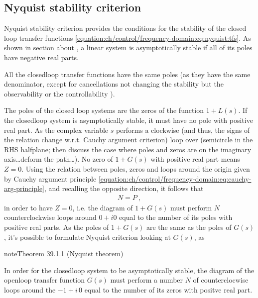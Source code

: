 \documentclass[letterpaper,10pt,english]{jupyterBook}
\begin{document}
\subsection{Nyquist stability criterion}
\label{\detokenize{ch/control/frequency-domain:nyquist-stability-criterion}}\label{\detokenize{ch/control/frequency-domain:control-frequency-siso-nyquist}}
\sphinxAtStartPar
Nyquist stability criterion provides the conditions for the stability of the closed loop transfer functions \eqref{equation:ch/control/frequency-domain:eq:nyquist:tfs}. As shown in section about {\hyperref[\detokenize{ch/system-theory/lti-stability-and-feedback:ode-lti-stability-fb}]{}}, a linear system is asymptotically stable if all of its poles have negative real parts.

\sphinxAtStartPar
All the closed\sphinxhyphen{}loop transfer functions have the same poles (as they have the same denominator, except for  cancellations not changing the stability but the observability or the controllability  ).

\sphinxAtStartPar
The poles of the closed loop systems are the zeros of the function \(1 + L(s)\). If the closed\sphinxhyphen{}loop system is asymptotically stable, it must have no pole with positive real part. As the complex variable \(s\) performs a clockwise (and thus, the signs of the relation change w.r.t. Cauchy argument criterion) loop over  (semicircle in the RHS half\sphinxhyphen{}plane; then  discuss the case where poles and zeros are on the imaginary axis…deform the path…). No zero of \(1 + G(s)\) with positive real part means \(Z = 0\). Using the relation between poles, zeros and loops around the origin given by Cauchy argument principle \eqref{equation:ch/control/frequency-domain:eq:cauchy-arg-principle}, and recalling the opposite direction, it follows that
\begin{equation*}
\begin{split}N = P \ ,\end{split}
\end{equation*}
\sphinxAtStartPar
in order to have \(Z = 0\), i.e. the diagram of \(1+G(s)\) must perform \(N\) counter\sphinxhyphen{}clockwise loops around \(0+i0\) equal to the number of its poles with positive real parts. As the poles of \(1+ G(s)\) are the same as the poles of \(G(s)\), it’s possible to formulate Nyquist criterion looking at \(G(s)\), as
\label{ch/control/frequency-domain:thm-nyquist}
\begin{sphinxadmonition}{note}{Theorem 39.1.1 (Nyquist theorem)}



\sphinxAtStartPar
In order for the closed\sphinxhyphen{}loop system to be asymptotically stable, the diagram of the open\sphinxhyphen{}loop transfer function \(G(s)\) must perform a number \(N\) of counter\sphinxhyphen{}clocwise loops around the  \(-1 + i \, 0\) equal to the number of its zeros with positve real part.
\end{sphinxadmonition}
\end{document}
